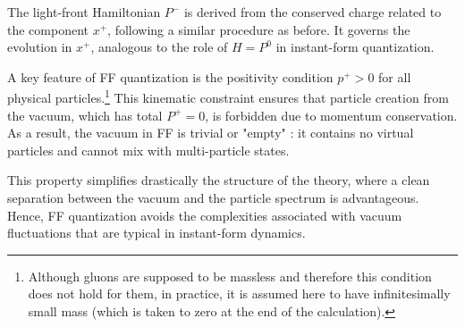 \documentclass[11pt,a4paper,twoside,pdf]{article}
\numberwithin{equation}{section}
\begin{document}
The light-front Hamiltonian \( P^- \) is derived from the conserved charge related 
to the component \( x^+ \), following a similar procedure as before. It governs 
the evolution in \( x^+ \), analogous to the role of \( H = P^0 \) in instant-form 
quantization.

A key feature of FF quantization is the positivity condition \( p^+ > 0 \) 
for all physical particles.\footnote{Although gluons are supposed to be massless and therefore this condition
does not hold for them, in practice, it is assumed here to have infinitesimally 
small mass (which is taken to zero at the end of the calculation)\cite{Galvez-Viruet:2022tqb}.}
 This kinematic constraint ensures that particle 
creation from the vacuum, which has total \( P^+ = 0 \), is forbidden due to 
momentum conservation. As a result, the vacuum in FF is trivial or "empty" \cite{Brodsky_1998}: 
it contains no virtual particles and cannot mix with multi-particle states.

This property simplifies drastically the structure of the theory, 
where a clean separation between the vacuum and 
the particle spectrum is advantageous. Hence, FF quantization avoids the 
complexities associated with vacuum fluctuations that are typical in 
instant-form dynamics.
\end{document}

